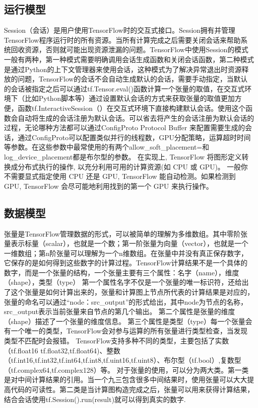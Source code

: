 		\subsection{运行模型}
		Session（会话）是用户使用TensorFlow时的交互式接口。Session拥有并管理TensorFlow程序运行时的所有资源。当所有计算完成之后需要关闭会话来帮助系统回收资源，否则就可能出现资源泄漏的问题。TensorFlow中使用Session的模式一般有两种，第一种模式需要明确调用会话生成函数和关闭会话函数，第二种模式是通过Python的上下文管理器来使用会话，这种模式为了解决异常退出时资源释放的问题，TensorFlow的会话不会自动生成默认的会话，需要手动指定，当默认的会话被指定之后可以通过tf.Tensor.eval()函数计算一个张量的取值，在交互式环境下（比如Python脚本等）通过设置默认会话的方式来获取张量的取值更加方便，函数tf.InteractiveSession（）在交互式环境下直接构建默认会话。使用这个函数会自动将生成的会话注册为默认会话。可以省去将产生的会话注册为默认会话的过程，无论哪种方法都可以通过ConfigProto Protocol Buffer 来配置需要生成的会话，通过ConfigProto可以配置类似并行的线程数，GPU分配策略，运算超时时间等参数。在这些参数中最常使用的有两个allow\_soft\_placement=和log\_device\_placement都是布尔型的参数。 
		在实现上, TensorFlow 将图形定义转换成分布式执行的操作, 以充分利用可用的计算资源(如 CPU 或 GPU)。 一般你不需要显式指定使用 CPU 还是 GPU, TensorFlow 能自动检测。如果检测到 GPU, TensorFlow 会尽可能地利用找到的第一个 GPU 来执行操作。
		
		\subsection{数据模型}
		张量是TensorFlow管理数据的形式，可以被简单的理解为多维数组。其中零阶张量表示标量（scalar），也就是一个数；第一阶张量为向量（vector），也就是一个一维数组；第n阶张量可以理解为一个n维数组。在张量中并没有真正保存数字，它保存的是如何得到这些数字的计算过程。TensorFlow计算结果不是一个具体的数字，而是一个张量的结构，一个张量主要有三个属性：名字（name），维度（shape），类型（type） 
		第一个属性名字不仅是一个张量的唯一标识符，还给出了这个张量是如何计算出来的，张量和计算图上节点所代表的计算结果是对应的，张量的命名可以通过“node：src\_output”的形式给出，其中node为节点的名称，src\_output表示当前张量来自节点的第几个输出。 
		第二个属性是张量的维度（shape）描述了一个张量的维度信息。 
		第三个属性是类型（type）每一个张量会有一个唯一的类型，TensorFlow会对参与运算的所有张量进行类型检查，当发现类型不匹配时会报错。 
		TensorFlow支持多种不同的类型，主要包括了实数（tf.float16 tf.float32,tf.float64)、整数（tf.int16,tf.int32,tf.int64,tf.int8,tf.uint16,tf.uint8）、布尔型（tf.bool）,复数型（tf.complex64,tf.complex128）等。 对于张量的使用，可以分为两大类。第一类是对中间计算结果的引用。当一个九三包含很多中间结果时，使用张量可以大大提高代码的可读性。第二类是当计算图构造完成之后，张量可以用来获得计算结果，结合会话使用tf.Session().run(result)就可以得到真实的数字.
